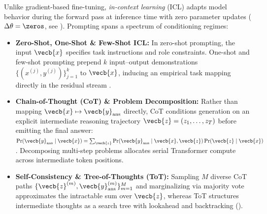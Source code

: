 \documentclass[../../../../master.tex]{subfiles}
\begin{document}
\begin{sloppypar}
Unlike gradient-based fine-tuning, \emph{in-context learning} (ICL) adapts model behavior during the forward pass at inference time with zero parameter updates ($\Delta\theta = \zeros$, see ). Prompting spans a spectrum of conditioning regimes:
\begin{itemize}
  \item \textbf{Zero-Shot, One-Shot \& Few-Shot ICL:} In zero-shot prompting, the input $\vecb{x}$ specifies task instructions and role constraints. One-shot and few-shot prompting prepend $k$ input--output demonstrations $\{(x^{(j)}, y^{(j)})\}_{j=1}^k$ to $\vecb{x}$, inducing an empirical task mapping directly in the residual stream .
  \item \textbf{Chain-of-Thought (CoT) \& Problem Decomposition:} Rather than mapping $\vecb{x} \mapsto \vecb{y}_{\mathrm{ans}}$ directly, CoT conditions generation on an explicit intermediate reasoning trajectory $\vecb{z} = (z_1, \dots, z_T)$ before emitting the final answer: $\Pr(\vecb{y}_{\mathrm{ans}} \mid \vecb{x}) = \sum_{\vecb{z}} \Pr(\vecb{y}_{\mathrm{ans}} \mid \vecb{x}, \vecb{z}) \Pr(\vecb{z} \mid \vecb{x})$ . Decomposing multi-step problems allocates serial Transformer compute across intermediate token positions.
  \item \textbf{Self-Consistency \& Tree-of-Thoughts (ToT):} Sampling $M$ diverse CoT paths $\{\vecb{z}^{(m)}, \vecb{y}_{\mathrm{ans}}^{(m)}\}_{m=1}^M$ and marginalizing via majority vote approximates the intractable sum over $\vecb{z}$, whereas ToT structures intermediate thoughts as a search tree with lookahead and backtracking ().
\end{itemize}
\end{sloppypar}
\end{document}
